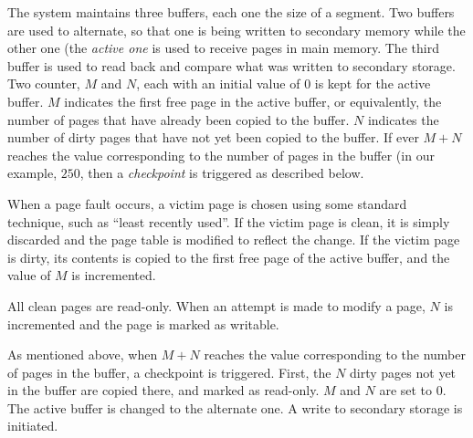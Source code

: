 The system maintains three buffers, each one the size of a segment.
Two buffers are used to alternate, so that one is being written to
secondary memory while the other one (the \emph{active one} is used to
receive pages in main memory.  The third buffer is used to read back
and compare what was written to secondary storage.  Two counter, $M$
and $N$, each with an initial value of $0$ is kept for the active
buffer.  $M$ indicates the first free page in the active buffer, or
equivalently, the number of pages that have already been copied to the
buffer.  $N$ indicates the number of dirty pages that have not yet
been copied to the buffer.  If ever $M+N$ reaches the value
corresponding to the number of pages in the buffer (in our example,
$250$, then a \emph{checkpoint} is triggered as described below.

When a page fault occurs, a victim page is chosen using some
standard technique, such as ``least recently used''.  If the victim
page is clean, it is simply discarded and the page table is modified
to reflect the change.  If the victim page is dirty, its contents is
copied to the first free page of the active buffer, and the value of
$M$ is incremented.

All clean pages are read-only.  When an attempt is made to modify a
page, $N$ is incremented and the page is marked as writable.

As mentioned above, when $M+N$ reaches the value corresponding to the
number of pages in the buffer, a checkpoint is triggered.  First, the
$N$ dirty pages not yet in the buffer are copied there, and marked as
read-only.  $M$ and $N$ are set to $0$.  The active buffer is changed
to the alternate one.  A write to secondary storage is initiated.
